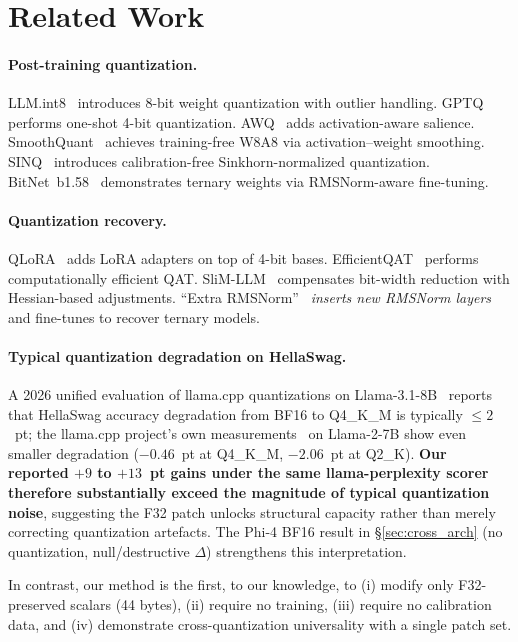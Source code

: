 \documentclass[11pt]{article}
\begin{document}
\section{Related Work}
\label{sec:related}

\paragraph{Post-training quantization.}
LLM.int8~\cite{dettmers2022int8} introduces 8-bit weight quantization with
outlier handling. GPTQ~\cite{gptq} performs one-shot 4-bit
quantization. AWQ~\cite{awq} adds activation-aware salience.
SmoothQuant~\cite{smoothquant} achieves training-free W8A8 via
activation--weight smoothing. SINQ~\cite{sinq} introduces calibration-free
Sinkhorn-normalized quantization. BitNet~b1.58~\cite{bitnet} demonstrates
ternary weights via RMSNorm-aware fine-tuning.

\paragraph{Quantization recovery.}
QLoRA~\cite{qlora} adds LoRA adapters on top of 4-bit bases.
EfficientQAT~\cite{efficientqat} performs computationally efficient QAT.
SliM-LLM~\cite{slimllm} compensates bit-width reduction with Hessian-based
adjustments. ``Extra RMSNorm''~\cite{extrarmsnorm} \emph{inserts new RMSNorm
layers} and fine-tunes to recover ternary models.

\paragraph{Typical quantization degradation on HellaSwag.}
A 2026 unified evaluation of llama.cpp quantizations on
Llama-3.1-8B~\cite{llamacppquanteval} reports that HellaSwag accuracy
degradation from BF16 to Q4\_K\_M is typically $\le 2$~pt; the
llama.cpp project's own measurements~\cite{llamacpp_hellaswag_disc} on
Llama-2-7B show even smaller degradation ($-0.46$~pt at Q4\_K\_M, $-2.06$~pt at
Q2\_K). \textbf{Our reported $+9$ to $+13$~pt gains under the same
llama-perplexity scorer therefore substantially exceed the magnitude of
typical quantization noise}, suggesting the F32 patch unlocks structural
capacity rather than merely correcting quantization artefacts. The Phi-4 BF16
result in \S\ref{sec:cross_arch} (no quantization, null/destructive $\Delta$)
strengthens this interpretation.

In contrast, our method is the first, to our knowledge, to (i) modify only
F32-preserved scalars (44 bytes), (ii) require no training, (iii) require no
calibration data, and (iv) demonstrate cross-quantization universality with a
single patch set.
\end{document}
